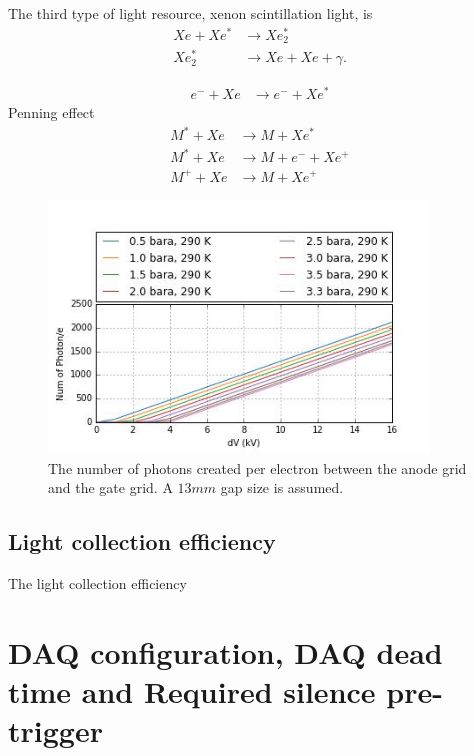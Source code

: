 The third type of light resource, xenon scintillation light, is 
\begin{align}
Xe + Xe^* &\rightarrow Xe_2^* \\
Xe_2^* &\rightarrow Xe + Xe + \gamma.
\end{align}

\begin{align}
e^- + Xe &\rightarrow e^- + Xe^*
\end{align}
Penning effect
\begin{align}
M^* + Xe &\rightarrow M + Xe^* \\
M^* + Xe &\rightarrow M + e^- + Xe^+  \\
M^+ + Xe &\rightarrow M + Xe^+
\end{align}



\begin{figure}[!ht]
  \centering
  \includegraphics[width=0.9\textwidth]
  {Figures/Ch10/PhotonCreation_Naive.jpg}
  \caption{The number of photons created per electron between the anode grid and the gate grid. A $13 mm$ gap size is assumed.}
  \label{fig: Photon Creation Naive}
\end{figure}


\subsection{Light collection efficiency}
The light collection efficiency


\section{DAQ configuration, DAQ dead time and Required silence pre-trigger}




